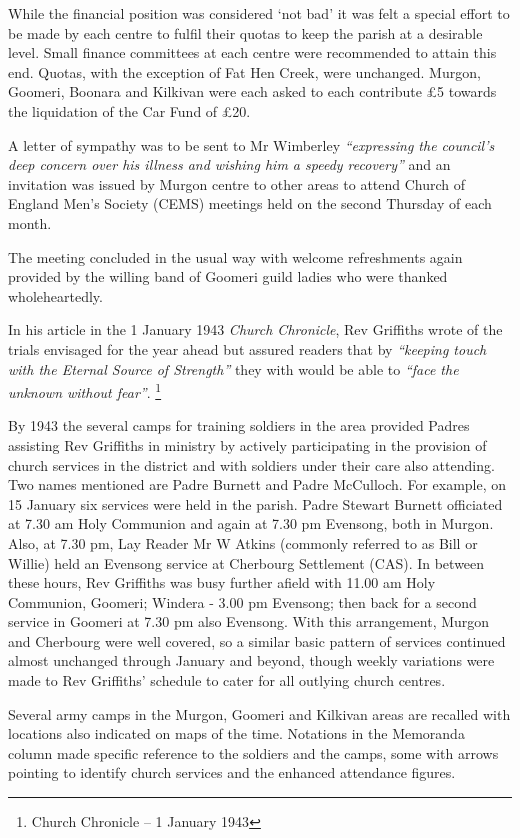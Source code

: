 While the financial position was considered `not bad' it was felt a special effort to be made by each centre to fulfil their quotas to keep the parish at a desirable level. Small finance committees at each centre were recommended to attain this end. Quotas, with the exception of Fat Hen Creek, were unchanged. Murgon, Goomeri, Boonara and Kilkivan were each asked to each contribute £5 towards the liquidation of the Car Fund of £20.

A letter of sympathy was to be sent to Mr Wimberley \emph{``expressing the council's deep concern over his illness and wishing him a speedy recovery''} and an invitation was issued by Murgon centre to other areas to attend Church of England Men's Society (CEMS) meetings held on the second Thursday of each month.

The meeting concluded in the usual way with welcome refreshments again provided by the willing band of Goomeri guild ladies who were thanked wholeheartedly.

In his article in the 1 January 1943 \emph{Church Chronicle}, Rev Griffiths wrote of the trials envisaged for the year ahead but assured readers that by \emph{``keeping touch with the Eternal Source of Strength''} they with would be able to \emph{``face the unknown without fear''}. \footnote{Church Chronicle -- 1 January 1943}

By 1943 the several camps for training soldiers in the area provided Padres assisting Rev Griffiths in ministry by actively participating in the provision of church services in the district and with soldiers under their care also attending. Two names mentioned are Padre Burnett and Padre McCulloch. For example, on 15 January six services were held in the parish. Padre Stewart Burnett officiated at 7.30 am Holy Communion and again at 7.30 pm Evensong, both in Murgon. Also, at 7.30 pm, Lay Reader Mr W Atkins (commonly referred to as Bill or Willie) held an Evensong service at Cherbourg Settlement (CAS). In between these hours, Rev Griffiths was busy further afield with 11.00 am Holy Communion, Goomeri; Windera - 3.00 pm Evensong; then back for a second service in Goomeri at 7.30 pm also Evensong. With this arrangement, Murgon and Cherbourg were well covered, so a similar basic pattern of services continued almost unchanged through January and beyond, though weekly variations were made to Rev Griffiths' schedule to cater for all outlying church centres.

Several army camps in the Murgon, Goomeri and Kilkivan areas are recalled with locations also indicated on maps of the time. Notations in the Memoranda column made specific reference to the soldiers and the camps, some with arrows pointing to identify church services and the enhanced attendance figures.

